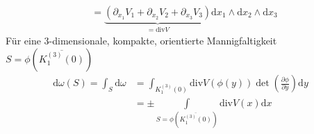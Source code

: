 \begin{example}
\begin{enum-arab}
\begin{align*}
      &= \underbrace{(\partial_{x_1} V_1 + \partial_{x_2} V_2 + \partial_{x_3} V_3)}_{=\mathrm{div} V} \mathrm d x_1 \wedge \mathrm d x_2 \wedge \mathrm d x_3
    \end{align*}
    Für eine $3$-dimensionale, kompakte, orientierte Mannigfaltigkeit $S = \phi(\overline{K_1^{(3)}(0)})$
    \begin{align*}
      \mathrm d \omega(S) = \int_S \mathrm d \omega &= \int_{K_1^{(3)}(0)} \mathrm{div} V(\phi(y)) \det(\tfrac{\partial \phi}{\partial y}) \mathrm d y \\
      &= \pm \int\limits_{S = \phi(\overline{K_1^{(3)}(0)})} \mathrm{div} V(x) \mathrm d x
    \end{align*}
  \end{enum-arab}
\end{example}

